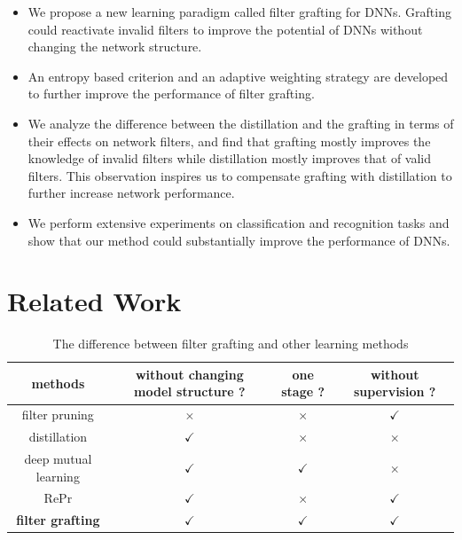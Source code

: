 \documentclass{article}
\begin{document}
\begin{itemize}
	\item We propose a new learning paradigm called filter grafting for DNNs. Grafting could reactivate invalid filters to improve the potential of DNNs without changing the network structure.
	
	\item An entropy based criterion and an adaptive weighting strategy are developed to further improve the performance of filter grafting.
	\item We analyze the difference between the distillation and the grafting in terms of their effects on network filters, and find that grafting mostly improves the knowledge of invalid filters while distillation mostly improves that of valid filters. This observation inspires us to compensate grafting with distillation to further increase network performance.
	\item We perform extensive experiments on classification and recognition tasks and show that our method could substantially improve the performance of DNNs. 
\end{itemize}

\section{Related Work}

\begin{table}[!t]
	\caption{The difference between filter grafting and other learning methods}
	\label{Related_Work_Difference}
	\begin{center}
		\footnotesize
		\begin{tabular}{|c|c|c|c|}
			\hline
			methods& without changing model structure ? &one stage ? & without supervision ?   \\ 
			\hline
			filter pruning \cite{li2016pruning}  & $\times$ &$ \times$ & $\checkmark$
			\\
			\hline
			distillation \cite{hinton2015distilling}&$\checkmark$ &$\times$ &$\times$
			\\	
			\hline	
			deep mutual learning \cite{zhang2018deep}&$\checkmark$ &$\checkmark$ &$\times$
			\\	
			\hline	
			RePr \cite{prakash2019repr} &$\checkmark$ &$\times$ &$\checkmark$
			\\
			\hline
			\textbf{filter grafting} &$\checkmark$ &$\checkmark$ &$\checkmark$
			\\
			\hline
		\end{tabular}
	\end{center}
\end{table}
\end{document}

